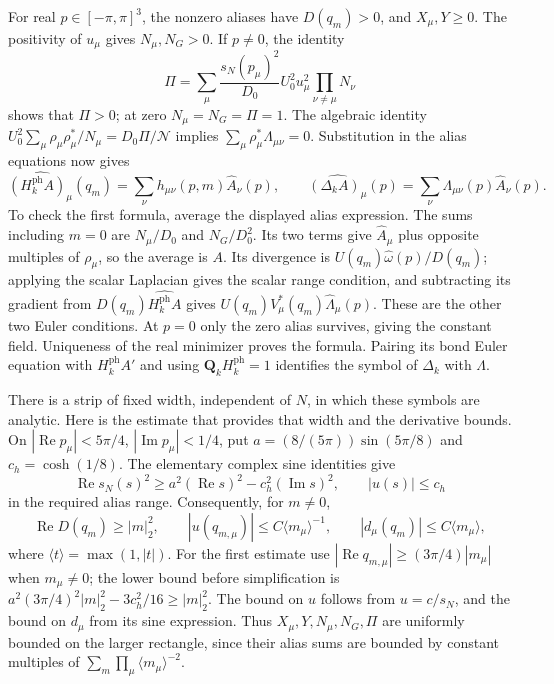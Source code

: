 \documentclass[11pt,letterpaper,reqno]{amsart}
\begin{document}
For real $p\in[-\pi,\pi]^3$, the nonzero aliases have $D(q_m)>0$,
and $X_\mu,Y\ge0$. The positivity of $u_\mu$ gives $N_\mu,N_G>0$.
If $p\ne0$, the identity
\begin{equation}\label{eq:photon-Pi-positive}
 \Pi=\sum_\mu\frac{s_N(p_\mu)^2}{D_0}
                 U_0^2u_\mu^2\prod_{\nu\ne\mu}N_\nu
\end{equation}
shows that $\Pi>0$; at zero $N_\mu=N_G=\Pi=1$.
The algebraic identity
$U_0^2\sum_\mu\rho_\mu\rho_\mu^*/N_\mu=D_0\Pi/\mathcal N$
implies $\sum_\mu\rho_\mu^*\Lambda_{\mu\nu}=0$.
Substitution in the alias equations now gives
\[
 \widehat{(H_k^{\mathrm{ph}}A)_\mu}(q_m)
      =\sum_\nu h_{\mu\nu}(p,m)\widehat A_\nu(p),\qquad
 \widehat{(\Delta_kA)_\mu}(p)
      =\sum_\nu\Lambda_{\mu\nu}(p)\widehat A_\nu(p).
\]
To check the first formula, average the displayed alias expression.
The sums including $m=0$ are $N_\mu/D_0$ and $N_G/D_0^2$.
Its two terms give $\widehat A_\mu$ plus opposite multiples of
$\rho_\mu$, so the average is $A$. Its divergence is
$U(q_m)\widehat\omega(p)/D(q_m)$; applying the scalar Laplacian
gives the scalar range condition, and subtracting its gradient from
$D(q_m)\widehat{H_k^{\mathrm{ph}}A}$ gives
$U(q_m)V_\mu^*(q_m)\widehat\Lambda_\mu(p)$.
These are the other two Euler conditions. At $p=0$ only the zero
alias survives, giving the constant field. Uniqueness of the real
minimizer proves the formula. Pairing its bond Euler equation with
$H_k^{\mathrm{ph}}A'$ and using $\mathbf Q_kH_k^{\mathrm{ph}}=1$
identifies the symbol of $\Delta_k$ with $\Lambda$.

There is a strip of fixed width, independent of $N$, in which these
symbols are analytic. Here is the estimate that provides that width
and the derivative bounds. On
$|\operatorname{Re}p_\mu|<5\pi/4$,
$|\operatorname{Im}p_\mu|<1/4$, put
$a=(8/(5\pi))\sin(5\pi/8)$ and $c_h=\cosh(1/8)$.
The elementary complex sine identities give
\[
 \operatorname{Re}s_N(s)^2\ge
       a^2(\operatorname{Re}s)^2-c_h^2(\operatorname{Im}s)^2,
 \qquad |u(s)|\le c_h
\]
in the required alias range. Consequently, for $m\ne0$,
\begin{equation}\label{eq:photon-alias-estimates}
 \operatorname{Re}D(q_m)\ge|m|_2^2,\qquad
 |u(q_{m,\mu})|\le C\langle m_\mu\rangle^{-1},\qquad
 |d_\mu(q_m)|\le C\langle m_\mu\rangle,
\end{equation}
where $\langle t\rangle=\max(1,|t|)$.
For the first estimate use
$|\operatorname{Re}q_{m,\mu}|\ge(3\pi/4)|m_\mu|$ when
$m_\mu\ne0$; the lower bound before simplification is
$a^2(3\pi/4)^2|m|_2^2-3c_h^2/16\ge|m|_2^2$.
The bound on $u$ follows from $u=c/s_N$, and the bound on $d_\mu$
from its sine expression. Thus $X_\mu,Y,N_\mu,N_G,\Pi$ are
uniformly bounded on the larger rectangle, since their alias sums
are bounded by constant multiples of
$\sum_m\prod_\mu\langle m_\mu\rangle^{-2}$.
\end{document}
